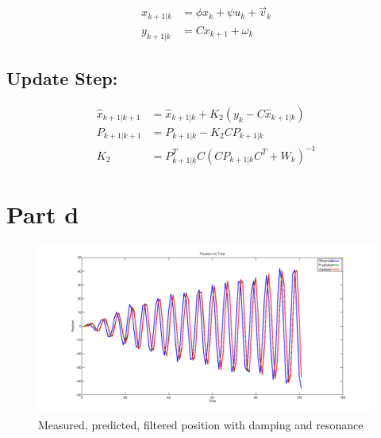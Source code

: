 \documentclass[12pt]{article}
\begin{document}
\begin{align*}
x_{k+1|k} &= \phi x_k + \psi u_k + \vec{v}_k\\
y_{k+1|k} &= Cx_{k+1} + \omega_k 
\end{align*}

\subsection*{Update Step:}
\begin{align*}
\hat{x}_{k+1|k+1} &= \hat{x}_{k+1|k} + K_2(y_k - C\hat{x}_{k+1|k})\\
P_{k+1|k+1} &= P_{k+1|k} - K_2CP_{k+1|k} \\
K_2 &= P_{k+1|k}^TC(CP_{k+1|k}C^T + W_k)^{-1}
\end{align*}

\section{Part d}

\begin{figure}
    \includegraphics[width=\linewidth]{kalman-position-damping}
    \caption{Measured, predicted, filtered position with damping and resonance}
\end{figure}
\end{document}
